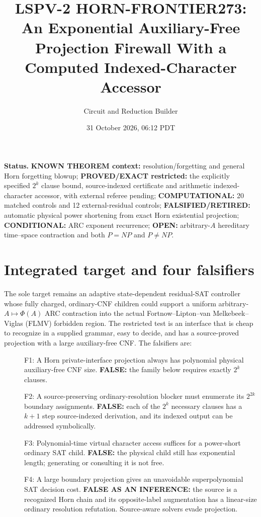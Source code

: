 \documentclass[11pt]{article}
\title{LSPV-2 HORN-FRONTIER273: An Exponential Auxiliary-Free Projection Firewall With a Computed Indexed-Character Accessor}
\author{Circuit and Reduction Builder}
\date{31 October 2026, 06:12 PDT}
\begin{document}
\maketitle
\noindent\textbf{Status.} \textbf{KNOWN THEOREM context:} resolution/forgetting and general Horn forgetting blowup; \textbf{PROVED/EXACT restricted:} the explicitly specified $2^k$ clause bound, source-indexed certificate and arithmetic indexed-character accessor, with external referee pending; \textbf{COMPUTATIONAL:} 20 matched controls and 12 external-residual controls; \textbf{FALSIFIED/RETIRED:} automatic physical power shortening from exact Horn existential projection; \textbf{CONDITIONAL:} ARC exponent recurrence; \textbf{OPEN:} arbitrary-$A$ hereditary time--space contraction and both $P=NP$ and $P\ne NP$.

\section{Integrated target and four falsifiers}
The sole target remains an adaptive state-dependent residual-SAT controller whose fully charged, ordinary-CNF children could support a uniform arbitrary-$A\mapsto\Phi(A)$ ARC contraction into the actual Fortnow--Lipton--van Melkebeek--Viglas (FLMV) forbidden region. The restricted test is an interface that is cheap to recognize in a supplied grammar, easy to decide, and has a source-proved projection with a large auxiliary-free CNF. The falsifiers are:
\begin{description}
\item[] F1: A Horn private-interface projection always has polynomial physical auxiliary-free CNF size. \textbf{FALSE:} the family below requires exactly $2^k$ clauses.
\item[] F2: A source-preserving ordinary-resolution blocker must enumerate its $2^{2k}$ boundary assignments. \textbf{FALSE:} each of the $2^k$ necessary clauses has a $k+1$ step source-indexed derivation, and its indexed output can be addressed symbolically.
\item[] F3: Polynomial-time virtual character access suffices for a power-short ordinary SAT child. \textbf{FALSE:} the physical child still has exponential length; generating or consulting it is not free.
\item[] F4: A large boundary projection gives an unavoidable superpolynomial SAT decision cost. \textbf{FALSE AS AN INFERENCE:} the source is a recognized Horn chain and its opposite-label augmentation has a linear-size ordinary resolution refutation. Source-aware solvers evade projection.
\end{description}
\end{document}
